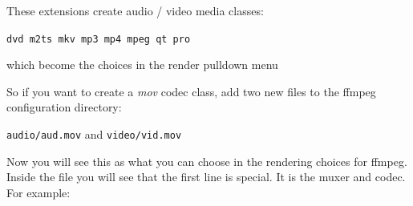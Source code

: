 These extensions create audio / video media classes:

\texttt{dvd \quad  m2ts \quad  mkv \quad  mp3 \quad  mp4 \quad  mpeg  \quad qt \quad  pro}

which become the choices in the render pulldown menu

So if you want to create a \textit{mov} codec class, add two new files to the ffmpeg configuration directory:

\texttt{audio/aud.mov}  and  \texttt{video/vid.mov}

Now you will see this as what you can choose in the rendering choices for ffmpeg.
Inside the file you will see that the first line is special.  It is the muxer and codec.  For example:

